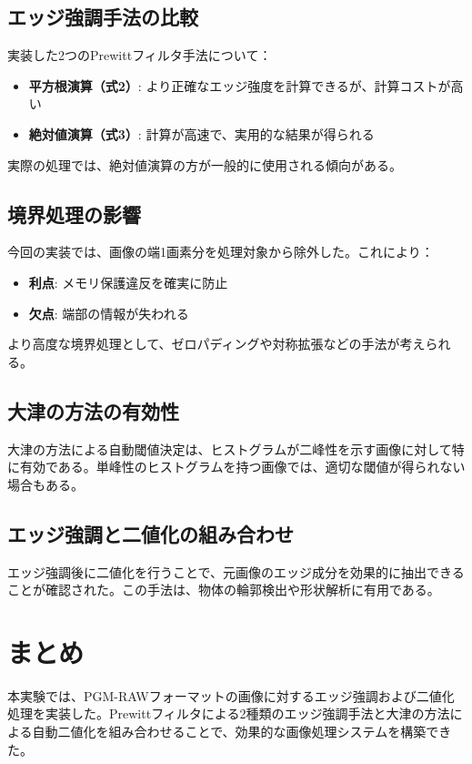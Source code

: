 \documentclass[a4paper,12pt]{jsarticle}
\begin{document}
\subsection{エッジ強調手法の比較}
実装した2つのPrewittフィルタ手法について：

\begin{itemize}
    \item \textbf{平方根演算（式2）}: より正確なエッジ強度を計算できるが、計算コストが高い
    \item \textbf{絶対値演算（式3）}: 計算が高速で、実用的な結果が得られる
\end{itemize}

実際の処理では、絶対値演算の方が一般的に使用される傾向がある。

\subsection{境界処理の影響}
今回の実装では、画像の端1画素分を処理対象から除外した。これにより：

\begin{itemize}
    \item \textbf{利点}: メモリ保護違反を確実に防止
    \item \textbf{欠点}: 端部の情報が失われる
\end{itemize}

より高度な境界処理として、ゼロパディングや対称拡張などの手法が考えられる。

\subsection{大津の方法の有効性}
大津の方法による自動閾値決定は、ヒストグラムが二峰性を示す画像に対して特に有効である。単峰性のヒストグラムを持つ画像では、適切な閾値が得られない場合もある。

\subsection{エッジ強調と二値化の組み合わせ}
エッジ強調後に二値化を行うことで、元画像のエッジ成分を効果的に抽出できることが確認された。この手法は、物体の輪郭検出や形状解析に有用である。

\section{まとめ}

本実験では、PGM-RAWフォーマットの画像に対するエッジ強調および二値化処理を実装した。Prewittフィルタによる2種類のエッジ強調手法と大津の方法による自動二値化を組み合わせることで、効果的な画像処理システムを構築できた。
\end{document}

